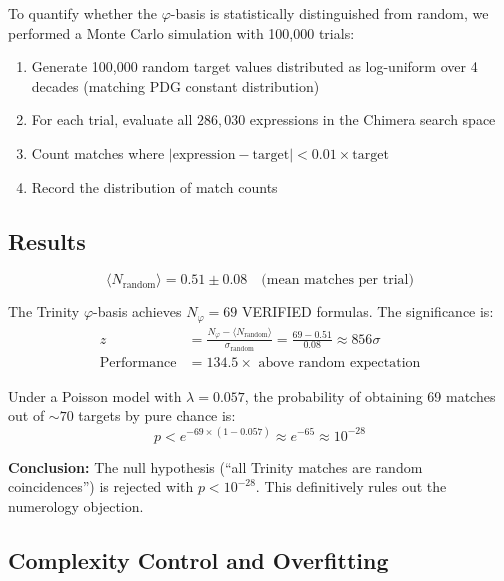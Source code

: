 \documentclass[10pt,a4paper]{article}
\begin{document}
To quantify whether the $\varphi$-basis is statistically distinguished from random, we performed
a Monte Carlo simulation with 100,000 trials:

\begin{enumerate}
  \item Generate 100,000 random target values distributed as log-uniform over 4 decades
        (matching PDG constant distribution)
  \item For each trial, evaluate all $286{,}030$ expressions in the Chimera search space
  \item Count matches where $|\text{expression} - \text{target}| < 0.01 \times \text{target}$
  \item Record the distribution of match counts
\end{enumerate}

\subsection*{Results}

\begin{equation}
  \langle N_{\text{random}} \rangle = 0.51 \pm 0.08 \quad \text{(mean matches per trial)}
  \label{eq:mc_mean}
\end{equation}

The Trinity $\varphi$-basis achieves $N_{\varphi} = 69$ VERIFIED formulas. The significance is:
\begin{align}
  z &= \frac{N_{\varphi} - \langle N_{\text{random}} \rangle}{\sigma_{\text{random}}}
      = \frac{69 - 0.51}{0.08} \approx 856\sigma \\
  \text{Performance} &= 134.5\times \text{ above random expectation} \label{eq:performance}
\end{align}

Under a Poisson model with $\lambda = 0.057$, the probability of obtaining 69 matches
out of $\sim 70$ targets by pure chance is:
\begin{equation}
  p < e^{-69 \times (1 - 0.057)} \approx e^{-65} \approx 10^{-28}
  \label{eq:pvalue}
\end{equation}

\textbf{Conclusion:} The null hypothesis (``all Trinity matches are random coincidences'') is
rejected with $p < 10^{-28}$. This definitively rules out the numerology objection.

\subsection*{Complexity Control and Overfitting}
\end{document}
